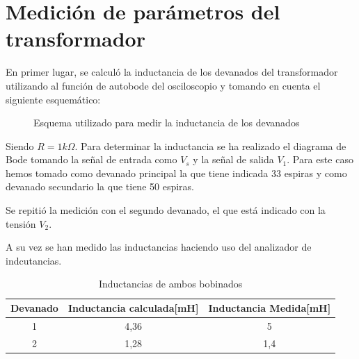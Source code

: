 \section{Medición de parámetros del transformador}
En primer lugar, se calculó la inductancia de los devanados del transformador utilizando al función de autobode del osciloscopio y tomando en cuenta el siguiente esquemático:

\begin{figure}[H]
    \label{fig:inductancia}
    \centering
    \caption{Esquema utilizado para medir la inductancia de los devanados}
\end{figure}

Siendo $R = 1k\Omega$. Para determinar la inductancia se ha realizado el diagrama de Bode tomando la señal de entrada como $V_s$ y la señal de salida $V_1$. Para este caso hemos tomado como devanado principal la que tiene indicada 33 espiras y como devanado secundario la que tiene 50 espiras. 

Se repitió la medición con el segundo devanado, el que está indicado con la tensión $V_2$. 

A su vez se han medido las inductancias haciendo uso del analizador de indcutancias.

\begin{table}[H]
    \centering
    \label{tab:tabla_ind}
    
    \begin{tabular}{|c|c|c|}
        \hline
       Devanado & Inductancia calculada[mH] &Inductancia Medida[mH] \\ 
        \hline
        1 & 4,36 & 5\\
        \hline
        2 & 1,28  & 1,4 \\
        \hline
    \end{tabular}
    
    \caption{Inductancias de ambos bobinados}
\end{table}

